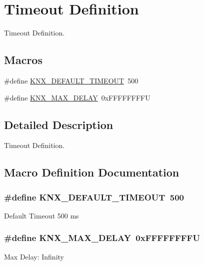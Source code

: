 \hypertarget{group___k_n_x___timeout}{}\section{Timeout Definition}
\label{group___k_n_x___timeout}


Timeout Definition.  


\subsection*{Macros}
\begin{DoxyCompactItemize}
\item 
\#define \hyperlink{group___k_n_x___timeout_ga2403c0399f3728bfe63f5d9cf631817d}{K\+N\+X\+\_\+\+D\+E\+F\+A\+U\+L\+T\+\_\+\+T\+I\+M\+E\+O\+UT}~500
\item 
\#define \hyperlink{group___k_n_x___timeout_ga8e1f26f2f54559b80991272e3b5e13e8}{K\+N\+X\+\_\+\+M\+A\+X\+\_\+\+D\+E\+L\+AY}~0x\+F\+F\+F\+F\+F\+F\+F\+FU
\end{DoxyCompactItemize}


\subsection{Detailed Description}
Timeout Definition. 



\subsection{Macro Definition Documentation}
\subsubsection[{\texorpdfstring{K\+N\+X\+\_\+\+D\+E\+F\+A\+U\+L\+T\+\_\+\+T\+I\+M\+E\+O\+UT}{KNX_DEFAULT_TIMEOUT}}]{\setlength{\rightskip}{0pt plus 5cm}\#define K\+N\+X\+\_\+\+D\+E\+F\+A\+U\+L\+T\+\_\+\+T\+I\+M\+E\+O\+UT~500}\hypertarget{group___k_n_x___timeout_ga2403c0399f3728bfe63f5d9cf631817d}{}\label{group___k_n_x___timeout_ga2403c0399f3728bfe63f5d9cf631817d}
Default Timeout 500 ms 
\subsubsection[{\texorpdfstring{K\+N\+X\+\_\+\+M\+A\+X\+\_\+\+D\+E\+L\+AY}{KNX_MAX_DELAY}}]{\setlength{\rightskip}{0pt plus 5cm}\#define K\+N\+X\+\_\+\+M\+A\+X\+\_\+\+D\+E\+L\+AY~0x\+F\+F\+F\+F\+F\+F\+F\+FU}\hypertarget{group___k_n_x___timeout_ga8e1f26f2f54559b80991272e3b5e13e8}{}\label{group___k_n_x___timeout_ga8e1f26f2f54559b80991272e3b5e13e8}
Max Delay\+: Infinity 